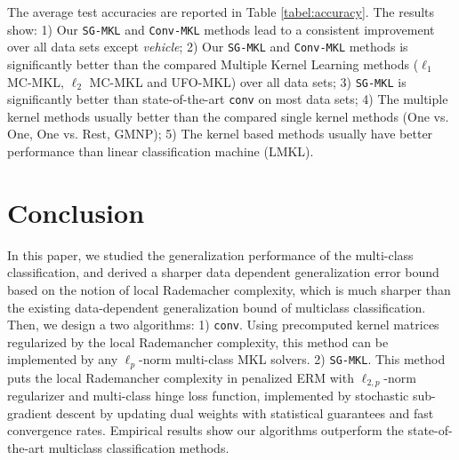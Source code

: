 \documentclass{article}
\begin{document}
The average test accuracies are reported in Table \ref{tabel:accuracy}.
The results show: 1) Our \texttt{SG-MKL} and \texttt{Conv-MKL} methods lead to a consistent improvement over all data sets except \textit{vehicle};
2) Our \texttt{SG-MKL} and \texttt{Conv-MKL} methods is significantly
better than the compared Multiple Kernel Learning methods ($\ell_1$ MC-MKL,
$\ell_2$ MC-MKL and UFO-MKL) over all data sets;
3) \texttt{SG-MKL}  is significantly better than state-of-the-art \texttt{conv} on most data sets;
4) The multiple kernel methods usually better than the compared single kernel methods (One vs. One, One vs. Rest, GMNP);
5) The kernel based methods usually have better performance than linear classification machine (LMKL).

\section{Conclusion}
In this paper, we studied the generalization performance of the multi-class classification,
and derived a sharper data dependent generalization error bound based on the notion of local Rademacher complexity,
which is much sharper than the existing data-dependent generalization bound of multiclass classification.
Then, we design a two algorithms: 1) \texttt{conv}.
Using precomputed kernel matrices regularized by the local Rademancher complexity,
this method can be implemented by any $\ell_p$-norm multi-class MKL solvers.
2) \texttt{SG-MKL}.
This method puts the local Rademancher complexity
in penalized ERM with $\ell_{2,p}$-norm regularizer and multi-class hinge loss function,
implemented by stochastic sub-gradient descent by updating
dual weights with statistical guarantees and fast convergence rates.
Empirical results show our algorithms outperform the state-of-the-art multiclass classification methods.


\end{document}
